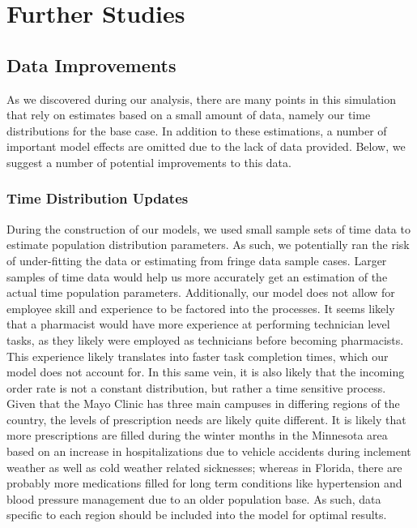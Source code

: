 \documentclass[10pt]{report}            %
\begin{document}
\section*{Further Studies}
\subsection*{Data Improvements}
As we discovered during our analysis, there are many points in this simulation that rely on estimates based on a small amount of data, namely our time distributions for the base case. In addition to these estimations, a number of important model effects are omitted due to the lack of data provided. Below, we suggest a number of potential improvements to this data.
\subsubsection*{Time Distribution Updates}
During the construction of our models, we used small sample sets of time data to estimate population distribution parameters. As such, we potentially ran the risk of under-fitting the data or estimating from fringe data sample cases. Larger samples of time data would help us more accurately get an estimation of the actual time population parameters.  Additionally, our model does not allow for employee skill and experience to be factored into the processes. It seems likely that a pharmacist would have more experience at performing technician level tasks, as they likely were employed as technicians before becoming pharmacists. This experience likely translates into faster task completion times, which our model does not account for. In this same vein, it is also likely that the incoming order rate is not a constant distribution, but rather a time sensitive process. Given that the Mayo Clinic has three main campuses in differing regions of the country, the levels of prescription needs are likely quite different. It is likely that more prescriptions are filled during the winter months in the Minnesota area based on an increase in hospitalizations due to vehicle accidents during inclement weather as well as cold weather related sicknesses; whereas in Florida, there are probably more medications filled for long term conditions like hypertension and blood pressure management due to an older population base. As such, data specific to each region should be included into the model for optimal results.
\end{document}
